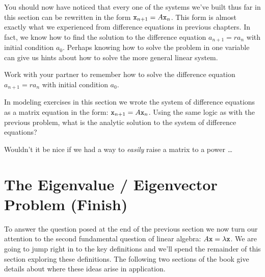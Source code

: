 You should now have noticed that every one of the systems we've built thus far in this
section can be rewritten in the form $\texttt{x}_{n+1} = A \texttt{x}_n$.   This form is almost exactly
what we experienced from difference equations in previous chapters.  In fact, we know how
to find the solution to the difference equation $a_{n+1} = r a_n$ with initial condition
$a_0$.  Perhaps knowing how to solve the problem in one variable can give us hints about
how to solve the more general linear system.
\begin{problem}
    Work with your partner to remember how to solve the difference equation $a_{n+1} = r
    a_n$ with initial condition $a_0$. 
\end{problem}
\begin{problem}
    In modeling exercises in this section we wrote the system of difference equations as
    a matrix equation in the form: $\texttt{x}_{n+1} = A \texttt{x}_n$.  Using the same logic as
    with the previous problem, what is the analytic solution to the system of
    difference equations?
\end{problem}


Wouldn't it be nice if we had a way to {\it easily} raise a matrix to a power \dots
        


\newpage\section{The Eigenvalue / Eigenvector Problem (Finish)}
To answer the question posed at the end of the previous section we now turn our attention to the second fundamental question of linear algebra: $A \texttt{x} =
\lambda \texttt{x}$.  We are going to jump right in to the key definitions and we'll spend the
remainder of this section exploring these definitions.  The following two sections of the
book give details about where these ideas arise in application.

